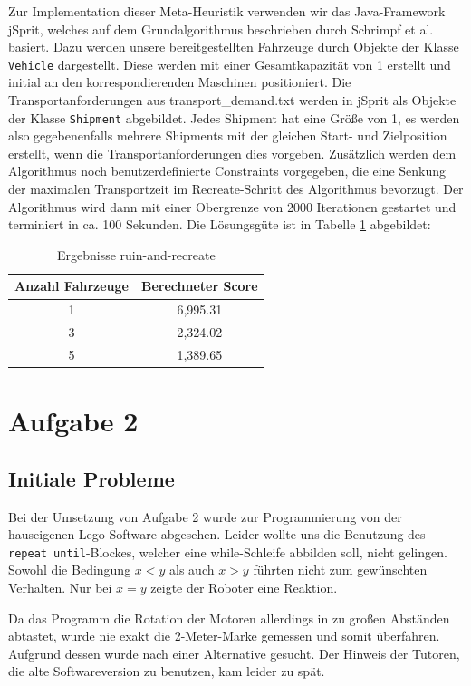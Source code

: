 \documentclass[ngerman]{tudscrreprt}
\newcommand{\code}[1]{\texttt{#1}}
\begin{document}
Zur Implementation dieser Meta-Heuristik verwenden wir das Java-Framework jSprit, welches auf dem Grundalgorithmus beschrieben durch Schrimpf et al. basiert. Dazu werden unsere bereitgestellten Fahrzeuge durch Objekte der Klasse \code{Vehicle} dargestellt. Diese werden mit einer Gesamtkapazität von 1 erstellt und initial an den korrespondierenden Maschinen positioniert. Die Transportanforderungen aus transport\_demand.txt werden in jSprit als Objekte der Klasse \code{Shipment} abgebildet. Jedes Shipment hat eine Größe von 1, es werden also gegebenenfalls mehrere Shipments mit der gleichen Start- und Zielposition erstellt, wenn die Transportanforderungen dies vorgeben. Zusätzlich werden dem Algorithmus noch benutzerdefinierte Constraints vorgegeben, die eine Senkung der maximalen Transportzeit im Recreate-Schritt des Algorithmus bevorzugt. Der Algorithmus wird dann mit einer Obergrenze von 2000 Iterationen gestartet und terminiert in ca. 100 Sekunden. Die Lösungsgüte ist in Tabelle \ref{table:ruin-and-recreate} abgebildet:
%
\begin{table}[H]
    \centering
    \begin{tabular}{|c|c|}
    \hline
    Anzahl Fahrzeuge & Berechneter Score \\ \hline
    1                & 6,995.31          \\ \hline
    3                & 2,324.02          \\ \hline
    5                & 1,389.65          \\ \hline
    \end{tabular}
    \caption{Ergebnisse ruin-and-recreate}
    \label{table:ruin-and-recreate}
\end{table}

\chapter{Aufgabe 2}
\section{Initiale Probleme}
Bei der Umsetzung von Aufgabe 2 wurde zur Programmierung von der hauseigenen Lego Software abgesehen. Leider wollte uns die Benutzung des \code{repeat until}-Blockes, welcher eine while-Schleife abbilden soll, nicht gelingen. Sowohl die Bedingung $x < y$ als auch $x > y$ führten nicht zum gewünschten Verhalten. Nur bei $x = y$ zeigte der Roboter eine Reaktion.

Da das Programm die Rotation der Motoren allerdings in zu großen Abständen abtastet, wurde nie exakt die 2-Meter-Marke gemessen und somit überfahren. Aufgrund dessen wurde nach einer Alternative gesucht. Der Hinweis der Tutoren, die alte Softwareversion zu benutzen, kam leider zu spät.
\end{document}

